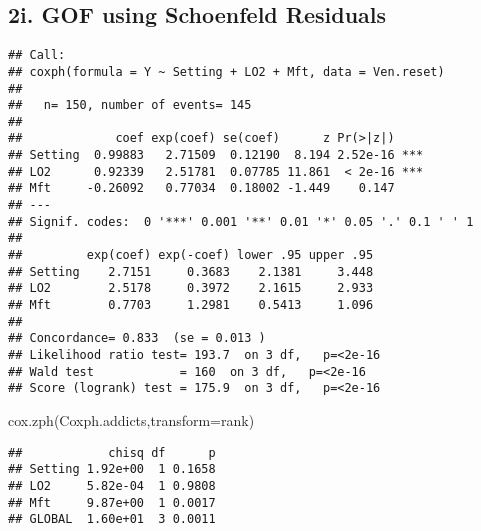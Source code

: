 \documentclass[
]{article}
\newenvironment{Shaded}{\begin{snugshade}}{\end{snugshade}}
\newcommand{\AttributeTok}[1]{\textcolor[rgb]{0.77,0.63,0.00}{#1}}
\newcommand{\FunctionTok}[1]{\textcolor[rgb]{0.00,0.00,0.00}{#1}}
\newcommand{\NormalTok}[1]{#1}
\newcommand{\OtherTok}[1]{\textcolor[rgb]{0.56,0.35,0.01}{#1}}
\newcommand{\SpecialCharTok}[1]{\textcolor[rgb]{0.00,0.00,0.00}{#1}}
\begin{document}
\hypertarget{i.-gof-using-schoenfeld-residuals}{%
\subsection{2i. GOF using Schoenfeld
Residuals}\label{i.-gof-using-schoenfeld-residuals}}

\begin{Shaded}
\end{Shaded}

\begin{verbatim}
## Call:
## coxph(formula = Y ~ Setting + LO2 + Mft, data = Ven.reset)
## 
##   n= 150, number of events= 145 
## 
##             coef exp(coef) se(coef)      z Pr(>|z|)    
## Setting  0.99883   2.71509  0.12190  8.194 2.52e-16 ***
## LO2      0.92339   2.51781  0.07785 11.861  < 2e-16 ***
## Mft     -0.26092   0.77034  0.18002 -1.449    0.147    
## ---
## Signif. codes:  0 '***' 0.001 '**' 0.01 '*' 0.05 '.' 0.1 ' ' 1
## 
##         exp(coef) exp(-coef) lower .95 upper .95
## Setting    2.7151     0.3683    2.1381     3.448
## LO2        2.5178     0.3972    2.1615     2.933
## Mft        0.7703     1.2981    0.5413     1.096
## 
## Concordance= 0.833  (se = 0.013 )
## Likelihood ratio test= 193.7  on 3 df,   p=<2e-16
## Wald test            = 160  on 3 df,   p=<2e-16
## Score (logrank) test = 175.9  on 3 df,   p=<2e-16
\end{verbatim}

\begin{Shaded}
\begin{Highlighting}[]
\FunctionTok{cox.zph}\NormalTok{(Coxph.addicts,}\AttributeTok{transform=}\NormalTok{rank)}
\end{Highlighting}
\end{Shaded}

\begin{verbatim}
##            chisq df      p
## Setting 1.92e+00  1 0.1658
## LO2     5.82e-04  1 0.9808
## Mft     9.87e+00  1 0.0017
## GLOBAL  1.60e+01  3 0.0011
\end{verbatim}
\end{document}
